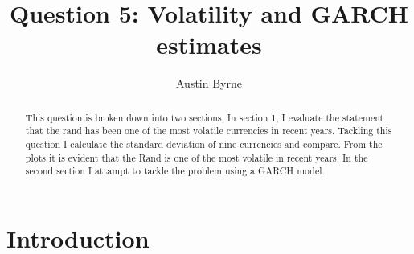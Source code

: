 \documentclass[11pt,preprint, authoryear]{elsarticle}
\numberwithin{equation}{section}
\numberwithin{figure}{section}
\numberwithin{table}{section}
\begin{document}
\begin{frontmatter}  %

\title{Question 5: Volatility and GARCH estimates}





\author[Add1]{Austin Byrne}





\address[Add1]{Stellenbosch University, Western Cape}


\begin{abstract}
\small{
This question is broken down into two sections, In section 1, I evaluate
the statement that the rand has been one of the most volatile currencies
in recent years. Tackling this question I calculate the standard
deviation of nine currencies and compare. From the plots it is evident
that the Rand is one of the most volatile in recent years. In the second
section I attampt to tackle the problem using a GARCH model.
}
\end{abstract}

\vspace{1cm}





\vspace{0.5cm}

\end{frontmatter}

\setcounter{footnote}{0}



\pagestyle{fancy}
\chead{}
\rhead{}
\lfoot{}
\rfoot{}
\lhead{}
\cfoot{}


\headsep 35pt %




\hypertarget{introduction}{%
\section{\texorpdfstring{Introduction
\label{Introduction}}{Introduction }}\label{introduction}}
\end{document}
